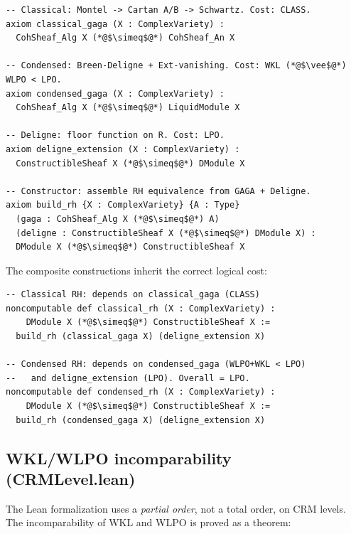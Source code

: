 \documentclass[11pt,a4paper]{article}
\theoremstyle{plain}
\theoremstyle{definition}
\newcommand{\WKL}{\textsf{WKL}}
\newcommand{\WLPO}{\textsf{WLPO}}
\begin{document}
\begin{tcolorbox}[leanbox={Classical vs condensed GAGA (CondensedGAGA.lean)}]
\begin{lstlisting}[style=leanstyle]
-- Classical: Montel -> Cartan A/B -> Schwartz. Cost: CLASS.
axiom classical_gaga (X : ComplexVariety) :
  CohSheaf_Alg X (*@$\simeq$@*) CohSheaf_An X

-- Condensed: Breen-Deligne + Ext-vanishing. Cost: WKL (*@$\vee$@*) WLPO < LPO.
axiom condensed_gaga (X : ComplexVariety) :
  CohSheaf_Alg X (*@$\simeq$@*) LiquidModule X

-- Deligne: floor function on R. Cost: LPO.
axiom deligne_extension (X : ComplexVariety) :
  ConstructibleSheaf X (*@$\simeq$@*) DModule X

-- Constructor: assemble RH equivalence from GAGA + Deligne.
axiom build_rh {X : ComplexVariety} {A : Type}
  (gaga : CohSheaf_Alg X (*@$\simeq$@*) A)
  (deligne : ConstructibleSheaf X (*@$\simeq$@*) DModule X) :
  DModule X (*@$\simeq$@*) ConstructibleSheaf X
\end{lstlisting}
\end{tcolorbox}

The composite constructions inherit the correct logical cost:

\begin{tcolorbox}[leanbox={The phase transition (CondensedGAGA.lean)}]
\begin{lstlisting}[style=leanstyle]
-- Classical RH: depends on classical_gaga (CLASS)
noncomputable def classical_rh (X : ComplexVariety) :
    DModule X (*@$\simeq$@*) ConstructibleSheaf X :=
  build_rh (classical_gaga X) (deligne_extension X)

-- Condensed RH: depends on condensed_gaga (WLPO+WKL < LPO)
--   and deligne_extension (LPO). Overall = LPO.
noncomputable def condensed_rh (X : ComplexVariety) :
    DModule X (*@$\simeq$@*) ConstructibleSheaf X :=
  build_rh (condensed_gaga X) (deligne_extension X)
\end{lstlisting}
\end{tcolorbox}

\subsection{WKL/WLPO incomparability (CRMLevel.lean)}

The Lean formalization uses a \emph{partial order}, not a total order, on CRM levels.
The incomparability of \WKL{} and \WLPO{} is proved as a theorem:
\end{document}
